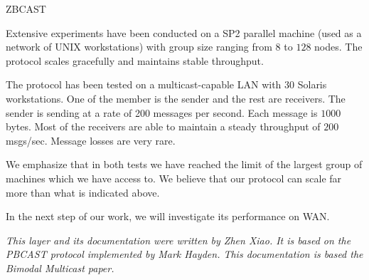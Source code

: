 \begin{Layer}{ZBCAST}
\begin{GenEvent}
\end{GenEvent}

\begin{Testing}
\item
Extensive experiments have been conducted on a SP2 parallel machine
(used as a network of UNIX workstations) with group size ranging from
$8$ to $128$ nodes.  The protocol scales gracefully and maintains
stable throughput.
\item
The protocol has been tested on a multicast-capable LAN with 30
Solaris workstations.  One of the member is the sender and the rest
are receivers.  The sender is sending at a rate of 200 messages per
second.  Each message is $1000$ bytes.  Most of the receivers are able
to maintain a steady throughput of $200$ msgs/sec.  Message losses are
very rare.

We emphasize that in both tests we have reached the limit of the
largest group of machines which we have access to.  We believe that
our protocol can scale far more than what is indicated above.
\item
In the next step of our work, we will investigate its performance on WAN.
\end{Testing}

\emph{This layer and its documentation were written by Zhen Xiao.  It
is based on the \emph{PBCAST} protocol implemented by Mark Hayden.
This documentation is based the \emph{Bimodal Multicast} paper.}
\end{Layer}
